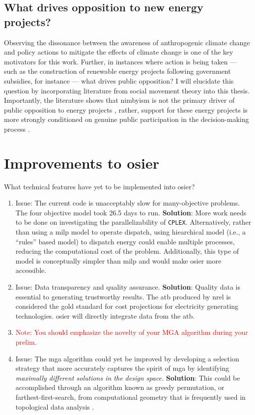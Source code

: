 \subsection{What drives opposition to new energy projects?}
Observing the dissonance between the awareness of anthropogenic climate change
and policy actions to mitigate the effects of climate change is one of the key
motivators for this work. Further, in instances where action is being taken ---
such as the construction of renewable energy projects following government
subsidies, for instance --- what drives public opposition? I will elucidate this
question by incorporating literature from social movement theory
\cite{mcadam_social_2017,mcadam_putting_2012} into this thesis. Importantly, the literature shows
that \ac{nimbyism} is not the primary driver of public opposition to energy
projects \cite{konisky_proximity_2021}, rather, support for these energy
projects is more strongly conditioned on genuine public participation in the
decision-making process \cite{summers_influencing_2020,ottinger_procedural_2014,
walker_procedural_2017,barragan-contreras_procedural_2022,gonyo_resident_2021}.


\section{Improvements to \ac{osier}}

What technical features have yet to be implemented into \ac{osier}?
\begin{enumerate}
    \item Issue: The current code is unacceptably slow for many-objective
    problems. The four objective model took 26.5 days to run. \textbf{Solution}:
    More work needs to be done on investigating the parallelizability of
    \texttt{CPLEX}. Alternatively, rather than using a \ac{milp} model to
    operate dispatch, using hiearchical model (i.e., a ``rules'' based model) to
    dispatch energy could enable multiple processes, reducing the computational
    cost of the problem. Additionally, this type of model is conceptually
    simpler than \ac{milp} and would make \ac{osier} more accessible.
    \item Issue: Data transparency and quality assurance. \textbf{Solution}:
    Quality data is essential to generating trustworthy results. The \ac{atb}
    produced by \ac{nrel} is considered the gold standard for cost projections
    for electricity generating technologies. \ac{osier} will directly integrate
    data from the \ac{atb}.
    \item \textcolor{red}{Note: You should emphasize the novelty of your MGA
    algorithm during your prelim.}
    \item Issue: The \ac{mga} algorithm could yet be improved by developing a selection
    strategy that more accurately captures the spirit of \ac{mga} by identifying 
    \textit{maximally different solutions in the design space.} \textbf{Solution}:
    This could be accomplished through an algorithm known as greedy permutation, or 
    farthest-first-search, from computational geometry that is frequently used in 
    topological data analysis \cite{cavanna_geometric_2015,eppstein_approximate_2020}.
\end{enumerate}

